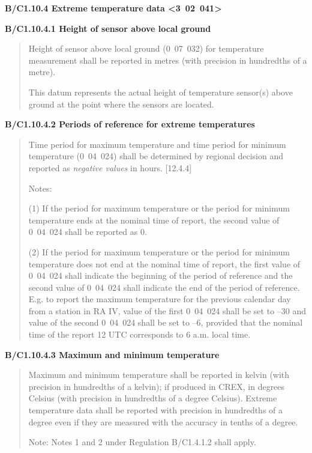 \textbf{B/C1.10.4 Extreme temperature data \textless3~02~041\textgreater{}}

\textbf{B/C1.10.4.1 Height of sensor above local ground}

\begin{quote}
Height of sensor above local ground (0~07~032) for temperature measurement shall be reported in metres (with precision in hundredths of a metre).

This datum represents the actual height of temperature sensor(s) above ground at the point where the sensors are located.
\end{quote}

\textbf{B/C1.10.4.2 Periods of reference for extreme temperatures}

\begin{quote}
Time period for maximum temperature and time period for minimum temperature (0~04~024) shall be determined by regional decision and reported as \emph{negative values} in hours. {[}12.4.4{]}

Notes:

(1) If the period for maximum temperature or the period for minimum temperature ends at the nominal time of report, the second value of 0~04~024 shall be reported as 0.

(2) If the period for maximum temperature or the period for minimum temperature does not end at the nominal time of report, the first value of 0~04~024 shall indicate the beginning of the period of reference and the second value of 0~04~024 shall indicate the end of the period of reference. E.g. to report the maximum temperature for the previous calendar day from a station in RA IV, value of the first 0~04~024 shall be set to --30 and value of the second 0~04~024 shall be set to --6, provided that the nominal time of the report 12 UTC corresponds to 6 a.m. local time.
\end{quote}

\textbf{B/C1.10.4.3 Maximum and minimum temperature}

\begin{quote}
Maximum and minimum temperature shall be reported in kelvin (with precision in hundredths of a kelvin); if produced in CREX, in degrees Celsius (with precision in hundredths of a degree Celsius). Extreme temperature data shall be reported with precision in hundredths of a degree even if they are measured with the accuracy in tenths of a degree.

Note: Notes 1 and 2 under Regulation B/C1.4.1.2 shall apply.
\end{quote}

